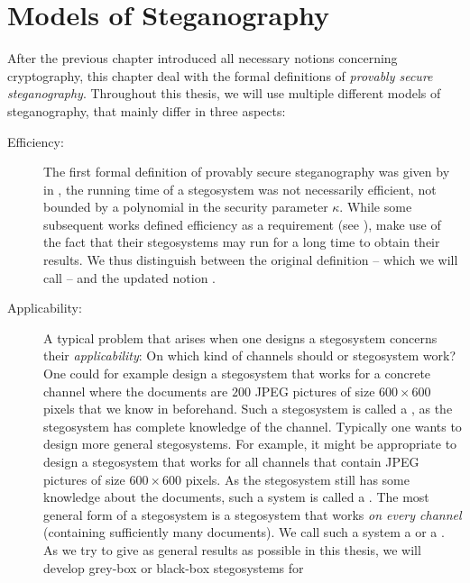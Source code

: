 \chapter{Models of Steganography}
After the previous chapter introduced all necessary notions concerning
cryptography, this chapter deal with the formal definitions of
\emph{provably secure steganography}. Throughout this thesis, we will
use multiple different models of steganography, that mainly differ in
three aspects:
\begin{description}
\item[Efficiency:] The first formal definition of provably secure
  steganography was given by \citeauthor{hopper2009provably} in
  \cite{hopper2009provably}, the running time of a stegosystem was
  not necessarily efficient, \ie not bounded by a polynomial in the
  security parameter $\kappa$. While some subsequent works defined
  efficiency as a requirement (see \eg \cite{backes2005active,
    dedic2009lower}), \citeauthor{hopper2009provably} make use of the
  fact that their stegosystems may run for a long time to obtain their
  results. We thus distinguish between the original definition -- which
  we will call  -- and the
  updated notion . 
\item[Applicability:] A typical problem that arises when one designs a stegosystem
  concerns their \emph{applicability}: On which kind of channels should
  or stegosystem work? One could for example design a stegosystem that
  works for a concrete channel where the documents are $200$ \acs{JPEG}
  pictures of size $600\times 600$ pixels that we know in
  beforehand. 
Such a stegosystem is called a , as the stegosystem has complete knowledge of the
  channel. Typically one wants to design more general stegosystems. For
  example, it might be appropriate to design a stegosystem that works
  for all channels that contain \acs{JPEG} pictures of size $600\times
  600$ pixels. As the stegosystem still has some knowledge about the
  documents, such a system is called a . The most general form of a stegosystem is a
  stegosystem that works \emph{on every channel} (containing
  sufficiently many documents). We call such a system a
   or a . As we try to give as general results as possible in
  this thesis, we will develop grey-box or black-box stegosystems for

\end{description}

